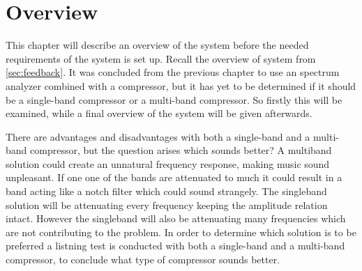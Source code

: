 \chapter{Overview} \label{ch:overview}
This chapter will describe an overview of the system before the needed requirements of the system is set up. Recall the overview of system from \autoref{sec:feedback}. It was concluded from the previous chapter to use an spectrum analyzer combined with a compressor, but it has yet to be determined if it should be a single-band compressor or a multi-band compressor. So firstly this will be examined, while a final overview of the system will be given afterwards. 


There are advantages and disadvantages with both a single-band and a multi-band compressor, but the question arises which sounds better?
A multiband solution could create an unnatural frequency response, making music sound unpleasant. If one one of the bands are attenuated to much it could result in a band acting like a notch filter which could sound strangely. The singleband solution will be attenuating every frequency keeping the amplitude relation intact. However the singleband will also be attenuating many frequencies which are not contributing to the problem. In order to determine which solution is to be preferred a listning test is conducted with both a single-band and a multi-band compressor, to conclude what type of compressor sounds better. 

